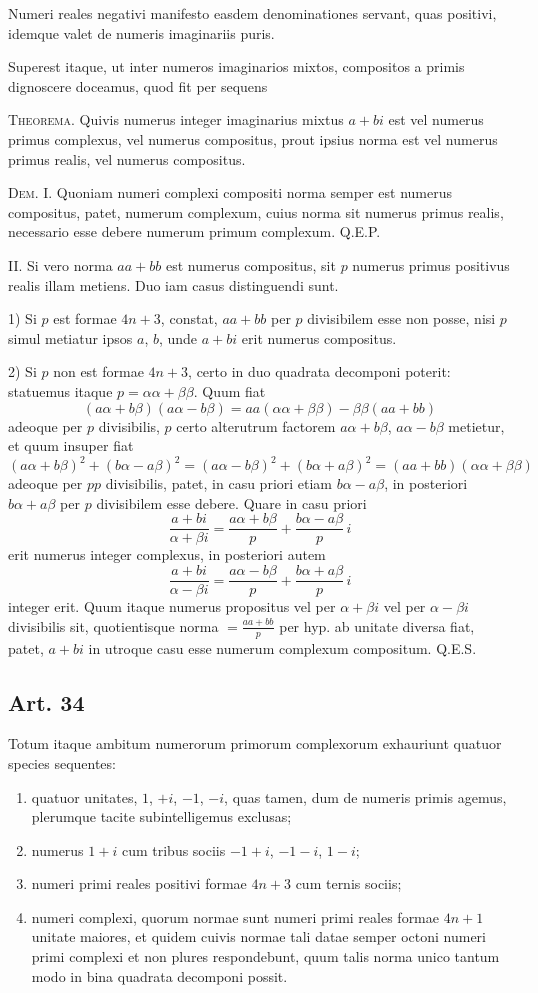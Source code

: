 \documentclass[12pt]{article}
\newcommand{\art}[1]{\subsection*{Art. #1}}
\begin{document}
Numeri reales negativi manifesto easdem denominationes servant, quas positivi, idemque valet de numeris imaginariis puris.

Superest itaque, ut inter numeros imaginarios mixtos, compositos a primis dignoscere doceamus, quod fit per sequens

\medskip
\noindent\textsc{Theorema.} Quivis numerus integer imaginarius mixtus $a+bi$ est vel numerus primus complexus, vel numerus compositus, prout ipsius norma est vel numerus primus realis, vel numerus compositus.

\medskip
\noindent\textsc{Dem.} I. Quoniam numeri complexi compositi norma semper est numerus compositus, patet, numerum complexum, cuius norma sit numerus primus realis, necessario esse debere numerum primum complexum. Q.E.P.

II. Si vero norma $aa+bb$ est numerus compositus, sit $p$ numerus primus positivus realis illam metiens. Duo iam casus distinguendi sunt.

1) Si $p$ est formae $4n+3$, constat, $aa+bb$ per $p$ divisibilem esse non posse, nisi $p$ simul metiatur ipsos $a$, $b$, unde $a+bi$ erit numerus compositus.

2) Si $p$ non est formae $4n+3$, certo in duo quadrata decomponi poterit: statuemus itaque $p=\alpha\alpha+\beta\beta$. Quum fiat
\[
(a\alpha+b\beta)(a\alpha-b\beta)=aa(\alpha\alpha+\beta\beta)-\beta\beta(aa+bb)
\]
adeoque per $p$ divisibilis, $p$ certo alterutrum factorem $a\alpha+b\beta$, $a\alpha-b\beta$ metietur, et quum insuper fiat
\[
(a\alpha+b\beta)^2+(b\alpha-a\beta)^2=(a\alpha-b\beta)^2+(b\alpha+a\beta)^2=(aa+bb)(\alpha\alpha+\beta\beta)
\]
adeoque per $pp$ divisibilis, patet, in casu priori etiam $b\alpha-a\beta$, in posteriori $b\alpha+a\beta$ per $p$ divisibilem esse debere. Quare in casu priori
\[
\frac{a+bi}{\alpha+\beta i}=\frac{a\alpha+b\beta}{p}+\frac{b\alpha-a\beta}{p}\,i
\]
erit numerus integer complexus, in posteriori autem
\[
\frac{a+bi}{\alpha-\beta i}=\frac{a\alpha-b\beta}{p}+\frac{b\alpha+a\beta}{p}\,i
\]
integer erit. Quum itaque numerus propositus vel per $\alpha+\beta i$ vel per $\alpha-\beta i$ divisibilis sit, quotientisque norma $=\frac{aa+bb}{p}$ per hyp. ab unitate diversa fiat, patet, $a+bi$ in utroque casu esse numerum complexum compositum. Q.E.S.

\art{34}

Totum itaque ambitum numerorum primorum complexorum exhauriunt quatuor species sequentes:
\begin{enumerate}[label=\arabic*)]
\item quatuor unitates, $1$, $+i$, $-1$, $-i$, quas tamen, dum de numeris primis agemus, plerumque tacite subintelligemus exclusas;
\item numerus $1+i$ cum tribus sociis $-1+i$, $-1-i$, $1-i$;
\item numeri primi reales positivi formae $4n+3$ cum ternis sociis;
\item numeri complexi, quorum normae sunt numeri primi reales formae $4n+1$ unitate maiores, et quidem cuivis normae tali datae semper octoni numeri primi complexi et non plures respondebunt, quum talis norma unico tantum modo in bina quadrata decomponi possit.
\end{enumerate}
\end{document}
